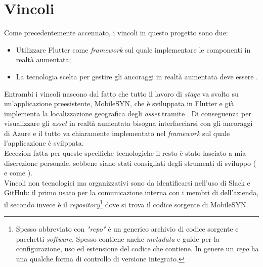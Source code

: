 \section{Vincoli}
Come precedentemente accennato, i vincoli in questo progetto sono due: 
\begin{itemize}
    \item Utilizzare Flutter come \textit{framework} sul quale implementare le componenti in realtà aumentata;
    \item La tecnologia scelta per gestire gli ancoraggi in realtà aumentata deve essere \asa{}.
\end{itemize}
Entrambi i vincoli nascono dal fatto che tutto il lavoro di \textit{stage} va svolto su un'applicazione preesistente, MobileSYN, che è sviluppata in Flutter e già implementa la localizzazione geografica degli \textit{asset} tramite \asa{}. Di conseguenza per visualizzare gli \textit{asset} in realtà aumentata bisogna interfacciarsi con gli ancoraggi di Azure e il tutto va chiaramente implementato nel \textit{framework} sul quale l'applicazione è svilppata.\\
Eccezion fatta per queste specifiche tecnologiche il resto è stato lasciato a mia discrezione personale, sebbene siano stati consigliati degli strumenti di sviluppo (\vsc{} e \astudio{} come \ide{}). \\
Vincoli non tecnologici ma organizzativi sono da identificarsi nell'uso di Slack e GitHub: il primo usato per la comunicazione interna con i membri di dell'azienda, il secondo invece è il \textit{repository}\footnote{Spesso abbreviato con \textit{"repo"} è un generico archivio di codice sorgente e pacchetti \textit{software}. Spesso contiene anche \textit{metadata} e guide per la configurazione, uso ed estensione del codice che contiene. In genere un \textit{repo} ha una qualche forma di controllo di versione integrato.} dove si trova il codice sorgente di MobileSYN.


